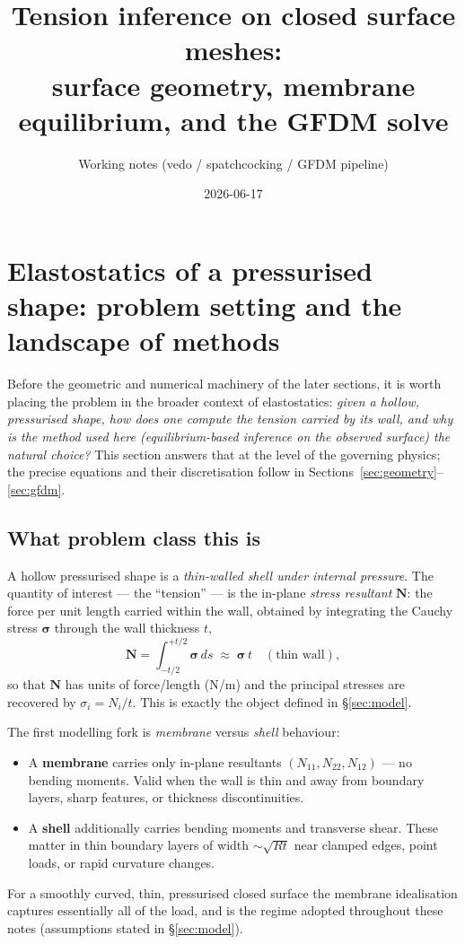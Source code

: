 \documentclass[11pt]{article}
\title{Tension inference on closed surface meshes:\\
\large surface geometry, membrane equilibrium, and the GFDM solve}
\author{Working notes (vedo / spatchcocking / GFDM pipeline)}
\date{2026-06-17}
\newcommand{\Nb}{\mathbf{N}}           %
\begin{document}
\maketitle
\tableofcontents
\bigskip

\section{Elastostatics of a pressurised shape: problem setting and the
landscape of methods}
\label{sec:elastostatics}

Before the geometric and numerical machinery of the later sections, it is worth
placing the problem in the broader context of elastostatics: \emph{given a
hollow, pressurised shape, how does one compute the tension carried by its
wall, and why is the method used here (equilibrium-based inference on the
observed surface) the natural choice?}  This section answers that at the level
of the governing physics; the precise equations and their discretisation follow
in Sections~\ref{sec:geometry}--\ref{sec:gfdm}.

\subsection{What problem class this is}

A hollow pressurised shape is a \emph{thin-walled shell under internal
pressure}.  The quantity of interest — the ``tension'' — is the in-plane
\emph{stress resultant} $\Nb$: the force per unit length carried within the
wall, obtained by integrating the Cauchy stress $\bm\sigma$ through the wall
thickness $t$,
\begin{equation}
  \Nb = \int_{-t/2}^{+t/2}\bm\sigma\,ds \;\approx\; \bm\sigma\,t
  \quad(\text{thin wall}),
  \label{eq:el-resultant}
\end{equation}
so that $\Nb$ has units of force/length (N/m) and the principal stresses are
recovered by $\sigma_i=N_i/t$.  This is exactly the object defined in
\S\ref{sec:model}.

The first modelling fork is \emph{membrane} versus \emph{shell} behaviour:
\begin{itemize}[nosep]
  \item A \textbf{membrane} carries only in-plane resultants $(N_{11},N_{22},
        N_{12})$ — no bending moments.  Valid when the wall is thin and away
        from boundary layers, sharp features, or thickness discontinuities.
  \item A \textbf{shell} additionally carries bending moments and transverse
        shear.  These matter in thin boundary layers of width $\sim\!\sqrt{Rt}$
        near clamped edges, point loads, or rapid curvature changes.
\end{itemize}
For a smoothly curved, thin, pressurised closed surface the membrane idealisation
captures essentially all of the load, and is the regime adopted throughout these
notes (assumptions stated in \S\ref{sec:model}).
\end{document}
